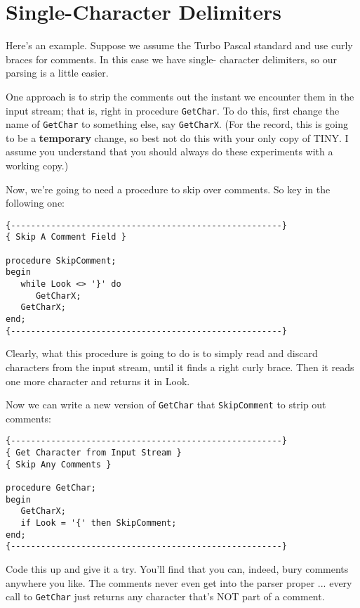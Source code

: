 \section{Single-Character Delimiters}

Here's an example. Suppose we assume the  Turbo  Pascal standard and use curly braces for comments. In this case we  have single- character delimiters, so our parsing is a little easier.

One  approach  is  to  strip  the  comments  out the  instant  we encounter them in the input stream; that is, right  in procedure {\tt GetChar}. To  do  this, first  change  the  name of {\tt GetChar} to something else, say {\tt GetCharX}. (For the record, this is  going to be a {\bfseries temporary} change, so best not do this with your only copy of TINY. I assume you understand that you should  always  do  these experiments with a working copy.)

Now, we're going to need a  procedure  to skip over comments. So key in the following one:

\begin{verbatim}
{------------------------------------------------------}
{ Skip A Comment Field }

procedure SkipComment;
begin
   while Look <> '}' do
      GetCharX;
   GetCharX;
end;
{------------------------------------------------------}
\end{verbatim}

Clearly, what this procedure is going to do is to simply read and discard characters from the input  stream, until it finds a right curly brace. Then it reads one more character and returns  it in Look.

Now we can  write  a  new  version of {\tt GetChar} that {\tt SkipComment} to strip out comments:

\begin{verbatim}
{------------------------------------------------------}
{ Get Character from Input Stream }
{ Skip Any Comments }

procedure GetChar;
begin
   GetCharX;
   if Look = '{' then SkipComment;
end;
{------------------------------------------------------}
\end{verbatim}

Code this up  and  give  it  a  try. You'll find that you can, indeed, bury comments anywhere you like. The comments never even get into the parser proper ... every call to {\tt GetChar} just returns any character that's NOT part of a comment.

